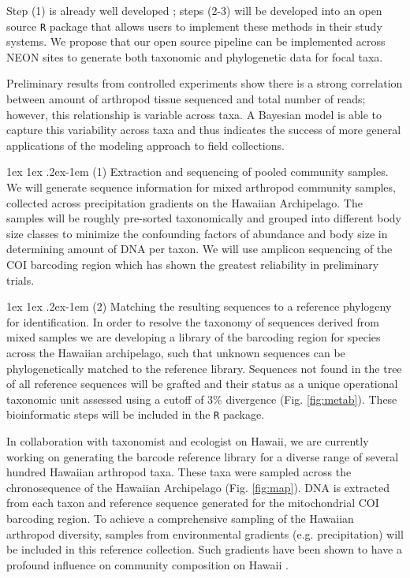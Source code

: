 \documentclass[11pt]{article}
\makeatletter
\renewcommand{\paragraph}{\@startsection{paragraph}{4}{\z@}
  {1ex \@plus 1ex \@minus .2ex}{-1em}
  {\normalfont\normalsize\it}
}
\makeatother
\begin{document}
Step (1) is already well developed \citep{krehenwinkel2016,
  shokralla2015, gibson2014, taberlet2012}; steps (2-3) will be
developed into an open source {\tt R} package that allows users to
implement these methods in their study systems.  We propose that our
open source pipeline can be implemented across NEON sites to generate
both taxonomic and phylogenetic data for focal taxa.

Preliminary results from controlled experiments show there is a strong
correlation between amount of arthropod tissue sequenced and total
number of reads; however, this relationship is variable across taxa. A
Bayesian model is able to capture this variability across taxa and
thus indicates the success of more general applications of the
modeling approach to field collections.

\paragraph{(1) Extraction and sequencing of pooled community samples.}
We will generate sequence information for mixed arthropod community
samples, collected across precipitation gradients on the Hawaiian
Archipelago. The samples will be roughly pre-sorted taxonomically and
grouped into different body size classes to minimize the confounding
factors of abundance and body size in determining amount of DNA per
taxon. We will use amplicon sequencing of the COI barcoding region
\citep{taberlet2012} which has shown the greatest reliability in
preliminary trials.


\paragraph{(2) Matching the resulting sequences to a reference
  phylogeny for identification.}
In order to resolve the taxonomy of sequences derived from mixed
samples we are developing a library of the barcoding region for
species across the Hawaiian archipelago, such that unknown sequences
can be phylogenetically matched to the reference library.
Sequences not found in the tree of all reference sequences will be
grafted and their status as a unique operational taxonomic unit
assessed using a cutoff of 3\% divergence (Fig. \ref{fig:metab}).
These bioinformatic steps will be included in the {\tt R} package.

In collaboration with taxonomist and ecologist on Hawaii, we are
currently working on generating the barcode reference library for a
diverse range of several hundred Hawaiian arthropod taxa. These taxa
were sampled across the chronosequence of the Hawaiian Archipelago
(Fig. \ref{fig:map}). DNA is extracted from each taxon and reference
sequence generated for the mitochondrial COI barcoding region. To
achieve a comprehensive sampling of the Hawaiian arthropod diversity,
samples from environmental gradients (e.g. precipitation) will be
included in this reference collection. Such gradients have been shown
to have a profound influence on community composition on Hawaii
\citep{zimmerman2012}.
\end{document}
